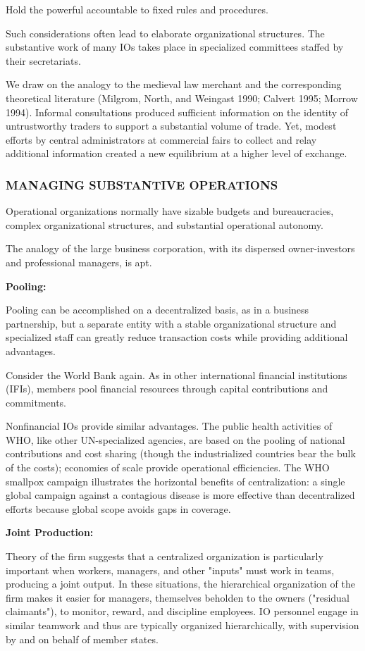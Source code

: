 Hold the powerful accountable to fixed rules and procedures.

Such considerations often lead to elaborate organizational structures. The substantive work of many IOs takes place in specialized committees staffed by their secretariats.

We draw on the analogy to the medieval law merchant and the corresponding theoretical literature (Milgrom, North, and Weingast 1990; Calvert 1995; Morrow 1994). Informal consultations produced sufficient information on the identity of untrustworthy traders to support a substantial volume of trade. Yet, modest efforts by central administrators at commercial fairs to collect and relay additional information created a new equilibrium at a higher level of exchange.

\subsubsection{MANAGING SUBSTANTIVE OPERATIONS}
Operational organizations normally have sizable budgets and bureaucracies, complex organizational structures, and substantial operational autonomy.

The analogy of the large business corporation, with its dispersed owner-investors and professional managers, is apt.

\textbf{Pooling:}

Pooling can be accomplished on a decentralized basis, as in a business partnership, but a separate entity with a stable organizational structure and specialized staff can greatly reduce transaction costs while providing additional advantages.

Consider the World Bank again. As in other international financial institutions (IFIs), members pool financial resources through capital contributions and commitments.

Nonfinancial IOs provide similar advantages. The public health activities of WHO, like other UN-specialized agencies, are based on the pooling of national contributions and cost sharing (though the industrialized countries bear the bulk of the costs); economies of scale provide operational efficiencies. The WHO smallpox campaign illustrates the horizontal benefits of centralization: a single global campaign against a contagious disease is more effective than decentralized efforts because global scope avoids gaps in coverage.

\textbf{Joint Production:}

Theory of the firm suggests that a centralized organization is particularly important when workers, managers, and other "inputs" must work in teams, producing a joint output. In these situations, the hierarchical organization of the firm makes it easier for managers, themselves beholden to the owners ("residual claimants"), to monitor, reward, and discipline employees. IO personnel engage in similar teamwork and thus are typically organized hierarchically, with supervision by and on behalf of member states.


